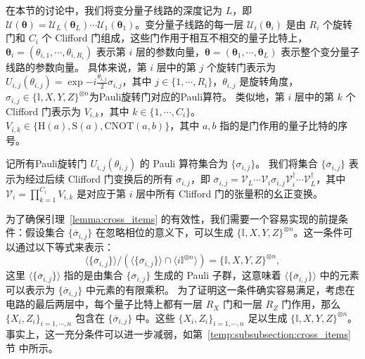 在本节的讨论中，我们将变分量子线路的深度记为 $L$，即 $\mathcal{U}(\bm{\theta})=\mathcal{U}_L(\bm{\theta}_L)\cdots\mathcal{U}_1(\bm{\theta}_1)$。变分量子线路的每一层 $\mathcal{U}_i(\bm{\theta}_i)$ 是由 $R_i$ 个旋转门和 $C_i$ 个 Clifford 门组成，这些门作用于相互不相交的量子比特上，$\bm{\theta}_i=(\theta_{i,1},\cdots,\theta_{i,R_i})$ 表示第 $i$ 层的参数向量，$\bm{\theta}=(\bm{\theta}_1,\cdots,\bm{\theta}_L)$ 表示整个变分量子线路的参数向量。
具体来说，第 $i$ 层中的第 $j$ 个旋转门表示为 $U_{i, j}(\theta_{i,j})=\exp{-i \frac{\theta_{i,j}}{2} \sigma_{i,j}}$，其中 $j \in \{1, \cdots , R_i\}$，$\theta_{i,j}$ 是旋转角度，$\sigma_{i, j}\in \{\mathbb{I}, X,Y,Z\}^{\otimes n}$为Pauli旋转门对应的Pauli算符。
类似地，第 $i$ 层中的第 $k$ 个 Clifford 门表示为 $V_{i,k}$，其中 $k \in \{1, \cdots , C_i\}$。$V_{i,k}\in\{\mathrm{H}(a),\mathrm{S}(a),\mathrm{CNOT}(a,b)\}$，其中 $a,b $ 指的是门作用的量子比特的序号。

记所有Pauli旋转门 $U_{i,j}(\theta_{i,j})$ 的 Pauli 算符集合为 $\{\sigma_{i,j}\}$。
我们将集合 $\{\overline{\sigma}_{i,j}\}$ 表示为经过后续 Clifford 门变换后的所有 $\sigma_{i,j}$，即 $\overline{\sigma}_{i,j}= \mathcal{V}_{L} \cdots \mathcal{V}_{i} \sigma_{i,j} \mathcal{V}_{i}^\dagger \cdots \mathcal{V}_{L}^\dagger$，其中 $\mathcal{V}_{i} = \prod_{k=1}^{C_i} V_{i,k}$ 是对应于第 $i$ 层中所有 Clifford 门的张量积的幺正变换。

为了确保引理~\ref{lemma:cross_items} 的有效性，我们需要一个容易实现的前提条件：假设集合 $\{\overline{\sigma}_{i,j}\}$ 在忽略相位的意义下，可以生成 $\{\mathbb{I}, X, Y, Z\}^{\otimes n}$。这一条件可以通过以下等式来表示：
\begin{equation}\label{eq:generate}
  \langle \{\overline{\sigma}_{i,j}\}\rangle/\left(\langle \{\overline{\sigma}_{i,j}\}\rangle\cap\langle i\mathbb{I}^{\otimes n}\rangle\right)=\{\mathbb{I},X,Y,Z\}^{\otimes n},
\end{equation}
这里 $\langle \{\overline{\sigma}_{i,j}\} \rangle$ 指的是由集合 $\{\overline{\sigma}_{i,j}\}$ 生成的 Pauli 子群，这意味着 $\langle \{\overline{\sigma}_{i,j}\}\rangle$ 中的元素可以表示为 $\{\overline{\sigma}_{i,j}\}$ 中元素的有限乘积。
为了证明这一条件确实容易满足，考虑在电路的最后两层中，每个量子比特上都有一层 $R_X$ 门和一层 $R_Z$ 门作用，那么 $\{X_i, Z_i\}_{i=1,\cdots,n}$ 包含在 $\{\overline{\sigma}_{i,j}\}$ 中。这些 $\{ X_i,Z_i \}_{i=1,\cdots,n}$ 足以生成 $\{\mathbb{I},X,Y,Z\}^{\otimes n}$。事实上，这一充分条件可以进一步减弱，如第~\ref{temp:subsubsection:cross_items}节 中所示。



